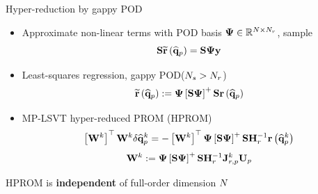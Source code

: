 \documentclass[]{beamer}
\begin{document}
\begin{frame}{Hyper-reduction by gappy POD}
    \begin{itemize}
		\item Approximate non-linear terms with POD basis $\deimBasis \in \mathbb{R}^{\numDOF \times \numResModes}$, sample
		\begin{equation*}
			\sampMat \resApproxFunc{\primVecCoef} = \sampMat \deimBasis \dummyVec
		\end{equation*}
		\item Least-squares regression, gappy POD\footnotemark[7] ($N_s > N_r$)
		\begin{equation*}
			\resApproxFunc{\primVecCoef} \defEq \deimBasis \left[ \sampMat \deimBasis \right]^{+} \sampMat \resFunc{\primVecCoef}
		\end{equation*}
		\item MP-LSVT hyper-reduced PROM (HPROM)
		\begin{equation*}
			\left[ \testBasis^\newtonIdx \right]^\top \testBasis^\newtonIdx \delta \primVecCoef^{\newtonIdx} = -\left[\testBasis^\newtonIdx \right]^\top \deimBasis \left[ \sampMat \deimBasis \right]^{+} \sampMat \resScaleInv \resFunc{\primVecCoef^{\newtonIdx}}
		\end{equation*}
		\begin{equation*}
			\testBasis^\newtonIdx \defEq \deimBasis \left[ \sampMat \deimBasis \right]^{+} \sampMat \resScaleInv \jacobResPrim^{\newtonIdx} \primTrial
		\end{equation*}
	\end{itemize}
	\begin{tcolorbox}[colframe=blue!50!white,halign=center]
		HPROM is \textbf{independent} of full-order dimension $N$
	\end{tcolorbox}
\end{frame}
\end{document}
